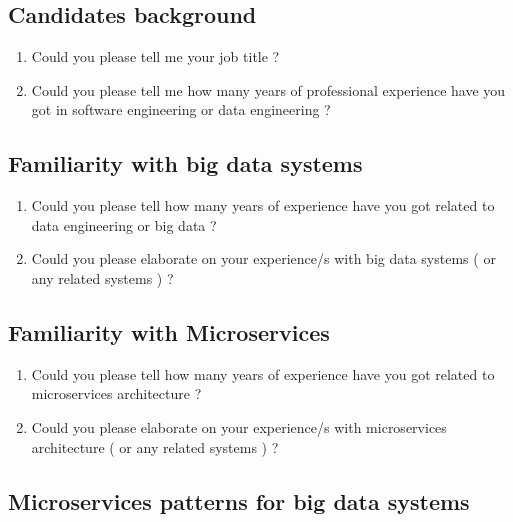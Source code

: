 \documentclass{bmcart}
\begin{document}
\begin{backmatter}
\subsection*{\textbf{Candidates background}}

\begin{enumerate}
    \item Could you please tell me your job title ? 
    \item Could you please tell me how many years of professional experience have you got in software engineering or data engineering ? 
\end{enumerate}

\subsection*{\textbf{Familiarity with big data systems}}

\begin{enumerate}
    \item Could you please tell how many years of experience have you got related to data engineering or big data ?
    \item Could you please elaborate on your experience/s with big data systems ( or any related systems ) ? 
\end{enumerate}


\subsection*{\textbf{Familiarity with Microservices}}

\begin{enumerate}
    \item Could you please tell how many years of experience have you got related to microservices architecture ?
    \item Could you please elaborate on your experience/s with microservices architecture ( or any related systems ) ?
\end{enumerate}


\subsection*{\textbf{Microservices patterns for big data systems}}


\end{backmatter}
\end{document}
